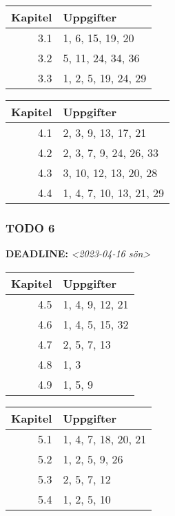\documentclass[11pt]{article}
\begin{document}
\begin{center}
\begin{tabular}{rl}
Kapitel & Uppgifter\\[0pt]
\hline
3.1 & 1, 6, 15, 19, 20\\[0pt]
3.2 & 5, 11, 24, 34, 36\\[0pt]
3.3 & 1, 2, 5, 19, 24, 29\\[0pt]
\end{tabular}
\end{center}


\begin{center}
\begin{tabular}{rl}
Kapitel & Uppgifter\\[0pt]
\hline
4.1 & 2, 3, 9, 13, 17, 21\\[0pt]
4.2 & 2, 3, 7, 9, 24, 26, 33\\[0pt]
4.3 & 3, 10, 12, 13, 20, 28\\[0pt]
4.4 & 1, 4, 7, 10, 13, 21, 29\\[0pt]
\end{tabular}
\end{center}


\subsubsection{{\bfseries\sffamily TODO} 6}
\label{sec:orgbe19f10}
\noindent\textbf{DEADLINE:} \textit{<2023-04-16 sön>}\\[0pt]
\begin{center}
\begin{tabular}{rl}
Kapitel & Uppgifter\\[0pt]
\hline
4.5 & 1, 4, 9, 12, 21\\[0pt]
4.6 & 1, 4, 5, 15, 32\\[0pt]
4.7 & 2, 5, 7, 13\\[0pt]
4.8 & 1, 3\\[0pt]
4.9 & 1, 5, 9\\[0pt]
\end{tabular}
\end{center}


\begin{center}
\begin{tabular}{rl}
Kapitel & Uppgifter\\[0pt]
\hline
5.1 & 1, 4, 7, 18, 20, 21\\[0pt]
5.2 & 1, 2, 5, 9, 26\\[0pt]
5.3 & 2, 5, 7, 12\\[0pt]
5.4 & 1, 2, 5, 10\\[0pt]
\end{tabular}
\end{center}
\end{document}
